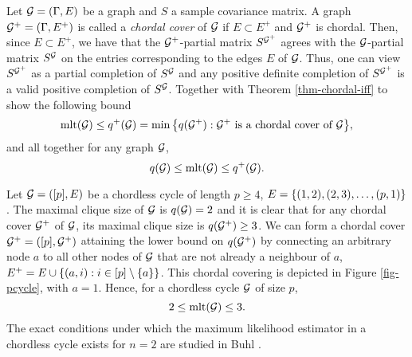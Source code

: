 Let ${\mathcal{G}} = (\Gamma, E)$ be a graph and $S$ a sample covariance matrix. A graph ${\mathcal{G}}^+ = (\Gamma, E^+)$ is called a \textit{chordal cover} of ${\mathcal{G}}$ if $E \subset E^+$ and ${\mathcal{G}}^+$ is chordal. Then, since $E \subset E^+$, we have that the ${\mathcal{G}}^+$-partial matrix $S^{{\mathcal{G}}^+}$ agrees with the ${\mathcal{G}}$-partial matrix $S^{\mathcal{G}}$ on the entries corresponding to the edges $E$ of ${\mathcal{G}}$. Thus, one can view $S^{{\mathcal{G}}^+}$ as a partial completion of $S^{\mathcal{G}}$ and any positive definite completion of $S^{{\mathcal{G}}^+}$ is a valid positive completion of $S^{\mathcal{G}}$. Together with Theorem \ref{thm-chordal-iff} to show the following bound
\begin{equation*}
    {\textrm{mlt}}({\mathcal{G}}) \leq q^+({\mathcal{G}}) = \min {\left\{ q({\mathcal{G}}^+) : {\mathcal{G}}^+ {\textrm{ is a chordal cover of }} {\mathcal{G}}\right\}},
\end{equation*}
and all together for any graph ${\mathcal{G}}$,
\begin{equation} \label{eq-mlt-bounds}
    q({\mathcal{G}}) \leq {\textrm{mlt}}({\mathcal{G}}) \leq q^+({\mathcal{G}}).
\end{equation}



\begin{example} \label{ex-pcycle}
    Let ${\mathcal{G}} = ([p], E)$ be a chordless cycle of length $p \geq 4$, $E = {\left\{ (1, 2), (2, 3), \ldots, (p, 1)\right\}}$. The maximal clique size of ${\mathcal{G}}$ is $q({\mathcal{G}}) = 2$ and it is clear that for any chordal cover ${\mathcal{G}}^+$ of ${\mathcal{G}}$, its maximal clique size is $q({\mathcal{G}}^+) \geq 3$. We can form a chordal cover ${\mathcal{G}}^+ = ([p], {\mathcal{G}}^+)$ attaining the lower bound on $q({\mathcal{G}}^+)$ by connecting an arbitrary node $a$ to all other nodes of ${\mathcal{G}}$ that are not already a neighbour of $a$, $E^+ = E \cup {\left\{ (a, i) : i \in [p] \setminus {\left\{a\right\}}\right\}}$. This chordal covering is depicted in Figure \ref{fig-pcycle}, with $a = 1$. Hence, for a chordless cycle ${\mathcal{G}}$ of size $p$,
    \begin{equation*}
        2 \leq {\textrm{mlt}}({\mathcal{G}}) \leq 3.
    \end{equation*}
    The exact conditions under which the maximum likelihood estimator in a chordless cycle exists for $n = 2$ are studied in Buhl \cite[Section 4]{Buhl1993OnTE}.
\end{example}


